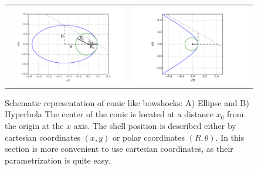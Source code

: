 \begin{figure}
\setlength\tabcolsep{0pt}
\begin{tabular}{cc}
\includegraphics[height=0.44\linewidth, trim=30 0 30 0, clip]{ellipse_py_lab} &
\includegraphics[height=0.44\linewidth, trim=60 0 70 0, clip]{hyperbola_py}
\end{tabular}
\label{fig:conics}
\caption{Schematic representation of conic like bowshocks: A) Ellipse and B) Hyperbola The center of the conic is located at a distance $x_0$ from the origin at the $x$ axis. The shell position is 
described either by cartesian coordinates $(x,y)$ or polar coordinates $(R,\theta)$. In this section is more convenient to use cartesian coordinates, as their parametrization is quite easy.}
\end{figure}
